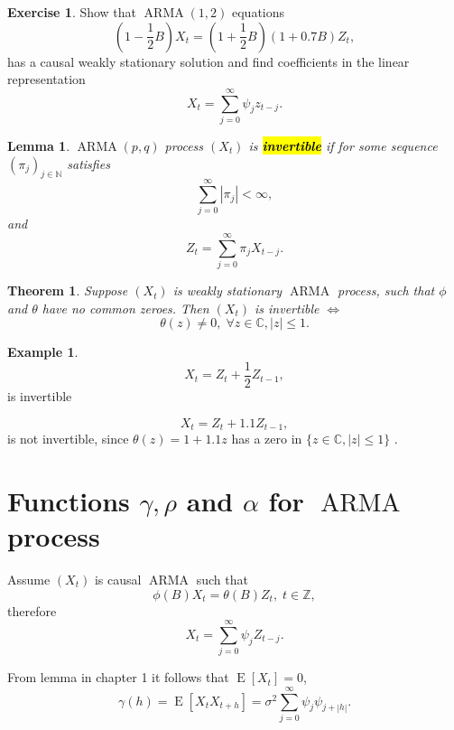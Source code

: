 \documentclass[12pt,a4paper, notitlepage]{book}
\newcommand{\hlc}[2][yellow]{ {\sethlcolor{#1} \hl{#2}} }
\newcommand{\hlcr}[1]{\hlc[lightred]{#1}}
\theoremstyle{definition} %
\newtheorem{example}{Example}[chapter]
\newtheorem{exercise}{Exercise}[chapter]
\theoremstyle{plain} %
\newtheorem{definition}{Lemma}[chapter]
\newtheorem{theorem}{Theorem}
\newcommand{\N}{\mathbb N}
\newcommand{\Z}{\mathbb Z}
\newcommand{\C}{\mathbb C}
\DeclareMathOperator{\E}{E}
\DeclareMathOperator{\Arma}{ARMA}
\newcommand{\New}[1]{ {\bf \hlcr{#1} } }
\begin{document}
\begin{exercise}
Show that $ \Arma(1,2) $ equations 
\[  (1 - \frac{1}{2} B) X_t = (1 + \frac{1}{2} B) (1 + 0.7 B) Z_t , \]
has a causal weakly stationary solution and find coefficients in the linear representation 
\[ X_t = \sum _{j=0} ^{\infty} \psi _j z_{t-j} . \]
\end{exercise}



\begin{definition}
$\Arma(p,q) $ process $ (X_t) $ is \New{invertible} if for some sequence  $ ( \pi _j) _{j \in \N } $ satisfies
\[ \sum _{j=0} ^{\infty} | \pi _j| < \infty , \]
and 
\[ Z_t = \sum _{j=0} ^{\infty} \pi _j X_{t-j} . \]
\end{definition}

 
\begin{theorem}
Suppose $ (X_t) $  is weakly stationary $ \Arma $ process, such that $ \phi $ and $ \theta $ have
no common zeroes. Then $ (X_t ) $ is invertible $ \iff $ 
\[ \theta (z) \neq 0 , \; \forall z \in \C, |z| \leq 1 . \]
\end{theorem}

\begin{example}
\[ X_t = Z_t + \frac{1}{2} Z_{t-1} , \] 
is invertible

\[ X_t = Z_t + 1.1 Z_{t-1} , \]
is not invertible, since $ \theta (z) = 1 + 1.1 z $ has a zero in $ \{ z\in \C , |z| \leq 1 \} $ .
\end{example}



\section{ Functions $ \gamma, \rho $ and $ \alpha $ for  $ \Arma $ process }

Assume $ (X_t ) $ is causal $ \Arma $ such that 
\[ \phi (B) X_t = \theta (B) Z_t , \; t \in \Z , \]
therefore 
\[ X_t = \sum _{j=0} ^{\infty} \psi _j Z_{t-j} . \]

From lemma in chapter 1 %
it follows that $ \E [ X_t ] = 0 $, 
\[ \gamma (h) = \E\left[ X_t X_{t+h} \right] = \sigma ^2 \sum_ {j=0} ^{\infty} \psi _j \psi _{j+|h|} . \]
\end{document}
